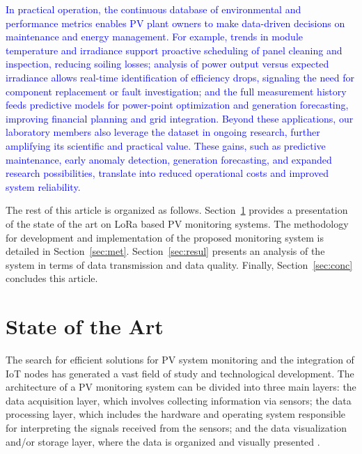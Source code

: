 \documentclass{ieeeaccess}
\begin{document}
\textcolor{blue}{
In practical operation, the continuous database of environmental and performance metrics enables PV plant owners to make data-driven decisions on maintenance and energy management. For example, trends in module temperature and irradiance support proactive scheduling of panel cleaning and inspection, reducing soiling losses; analysis of power output versus expected irradiance allows real-time identification of efficiency drops, signaling the need for component replacement or fault investigation; and the full measurement history feeds predictive models for power-point optimization and generation forecasting, improving financial planning and grid integration. Beyond these applications, our laboratory members also leverage the dataset in ongoing research, further amplifying its scientific and practical value. These gains, such as predictive maintenance, early anomaly detection, generation forecasting, and expanded research possibilities, translate into reduced operational costs and improved system reliability.
}



The rest of this article is organized as follows. Section~\ref{sec:stat} provides a presentation of the state of the art on LoRa based PV monitoring systems. The methodology for development and implementation of the proposed monitoring system is detailed in Section~\ref{sec:met}. Section~\ref{sec:resul} presents an analysis of the  system in terms of data transmission and data quality. Finally, Section~\ref{sec:conc} concludes this article.


\section{ State of the Art}
\label{sec:stat}
The search for efficient solutions for PV system monitoring and the integration of IoT nodes has generated a vast field of study and technological development. The architecture of a PV monitoring system can be divided into three main layers: the data acquisition layer, which involves collecting information via sensors; the data processing layer, which includes the hardware and operating system responsible for interpreting the signals received from the sensors; and the data visualization and/or storage layer, where the data is organized and visually presented \cite{ansari2021review}. 
\end{document}
